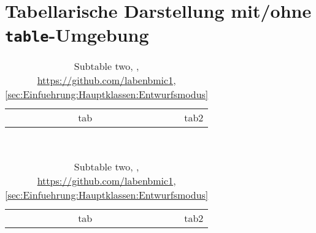 \chapter{Tabellarische Darstellung mit/ohne \texttt{table}-Umgebung}
\label{chap:Tabellen}
\begin{table}
	\caption{Tabelle mit -subtable ohne -captionsetup (\texttt{komafont}, \cite{LabenbacherTeX})}
	\label{tab:Tabellen:Tabelle mit latex-subtable ohne latex-captionsetup (Standard: komafont)}
	\begin{subtable}[b]{\linewidth}
		\caption{Subtable one}
		\label{subtab:Tabellen:mit latex-subtable:one}
	\begin{tabular}{|r|r|}
		tab & tab2
	\end{tabular}
	\end{subtable}\\
	\begin{subtable}[b]{\linewidth}\centering
		\caption{Subtable two, \cite{LabenbacherTeX}, \url{https://github.com/labenbmic1},  \ref{sec:Einfuehrung:Hauptklassen:Entwurfsmodus}}
		\label{subtab:Tabellen:mit latex-subtable:two}
	\begin{tabular}{|r|r|}
		tab & tab2
	\end{tabular}
	\end{subtable}
\end{table}

